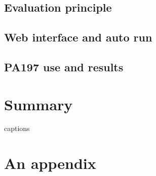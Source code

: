 \documentclass[
  digital, %
  table,   %
  nolof,     %
  nolot,     %
           oneside
]{fithesis3}
\begin{document}
  \section{Evaluation principle}\label{sec:eval}
  \section{Web interface and auto run}
  \section{PA197 use and results}
\chapter{Summary}




{\csname captions\languagename\endcsname %
\makeatletter %
  \thesis@selectLocale{\thesis@locale}\makeatother
\printbibliography[heading=bibintoc]} %

\appendix %
\chapter{An appendix}
\end{document}
